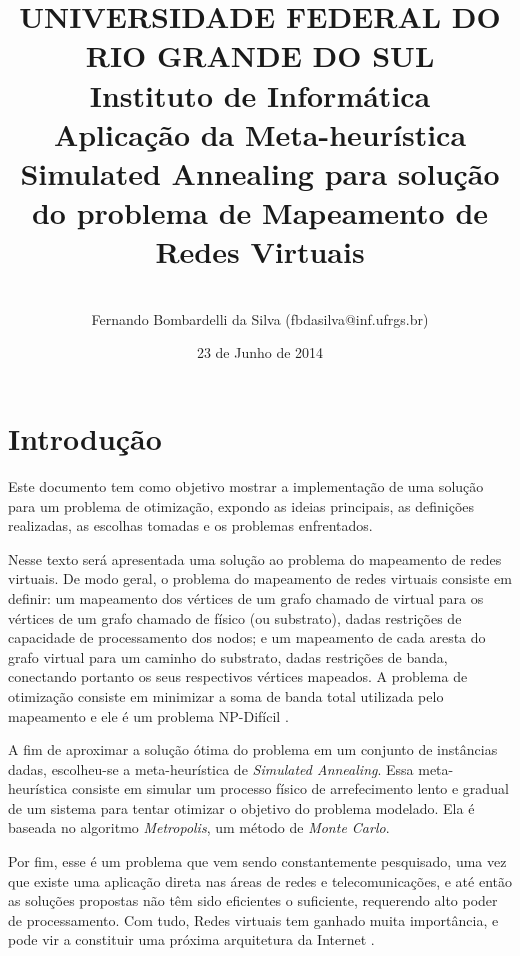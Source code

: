 \documentclass{article}
\title{
\Large{
UNIVERSIDADE FEDERAL DO RIO GRANDE DO SUL\\
Instituto de Informática
}\\
\vspace{6cm}\textbf{Aplicação da Meta-heurística Simulated Annealing para solução do problema de Mapeamento de Redes Virtuais}\\
}
\author{
\vspace{4cm}\\
\vspace{4cm}Fernando Bombardelli da Silva (fbdasilva@inf.ufrgs.br)\\
}
\date{23 de Junho de 2014} %
\begin{document}
\maketitle



\newpage
{}
\tableofcontents
\newpage

\section{Introdução}
Este documento tem como objetivo mostrar a implementação de uma solução para um problema de otimização, expondo as ideias principais, as definições realizadas, as escolhas tomadas e os problemas enfrentados.

Nesse texto será apresentada uma solução ao problema do mapeamento de redes virtuais. De modo geral, o problema do mapeamento de redes virtuais consiste em definir: um mapeamento dos vértices de um grafo chamado de virtual para os vértices de um grafo chamado de físico (ou substrato), dadas restrições de capacidade de processamento dos nodos; e um mapeamento de cada aresta do grafo virtual para um caminho do substrato, dadas restrições de banda, conectando portanto os seus respectivos vértices mapeados. A problema de otimização consiste em minimizar a soma de banda total utilizada pelo mapeamento e ele é um problema NP-Difícil \cite{Melo}.

A fim de aproximar a solução ótima do problema em um conjunto de instâncias dadas, escolheu-se a meta-heurística de \emph{Simulated Annealing}. Essa meta-heurística consiste em simular um processo físico de arrefecimento lento e gradual de um sistema para tentar otimizar o objetivo do problema modelado. Ela é baseada no algoritmo \emph{Metropolis}, um método de \emph{Monte Carlo}.

Por fim, esse é um problema que vem sendo constantemente pesquisado, uma vez que existe uma aplicação direta nas áreas de redes e telecomunicações, e até então as soluções propostas não têm sido eficientes o suficiente, requerendo alto poder de processamento. Com tudo, Redes virtuais tem ganhado muita importância, e pode vir a constituir uma próxima arquitetura da Internet \cite{Melo}.
\end{document}
